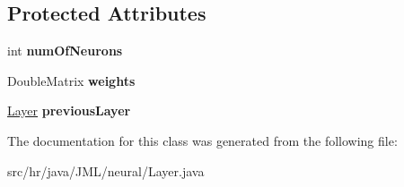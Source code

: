 \subsection*{Protected Attributes}
\begin{DoxyCompactItemize}
\item 
\hypertarget{classhr_1_1java_1_1_j_m_l_1_1neural_1_1_layer_a60ed2080e6620f42f632a14e2a8be5aa}{int {\bfseries num\+Of\+Neurons}}\label{classhr_1_1java_1_1_j_m_l_1_1neural_1_1_layer_a60ed2080e6620f42f632a14e2a8be5aa}

\item 
\hypertarget{classhr_1_1java_1_1_j_m_l_1_1neural_1_1_layer_ac6e584a64d1005ca3bf2284da926963e}{Double\+Matrix {\bfseries weights}}\label{classhr_1_1java_1_1_j_m_l_1_1neural_1_1_layer_ac6e584a64d1005ca3bf2284da926963e}

\item 
\hypertarget{classhr_1_1java_1_1_j_m_l_1_1neural_1_1_layer_a236aed43fa2b00808947171931c3b323}{\hyperlink{classhr_1_1java_1_1_j_m_l_1_1neural_1_1_layer}{Layer} {\bfseries previous\+Layer}}\label{classhr_1_1java_1_1_j_m_l_1_1neural_1_1_layer_a236aed43fa2b00808947171931c3b323}

\end{DoxyCompactItemize}


The documentation for this class was generated from the following file\+:\begin{DoxyCompactItemize}
\item 
src/hr/java/\+J\+M\+L/neural/Layer.\+java\end{DoxyCompactItemize}
